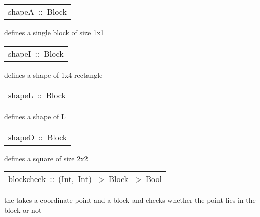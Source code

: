 \begin{haddockdesc}
\item[\begin{tabular}{@{}l}
shapeA\ ::\ Block
\end{tabular}]\haddockbegindoc
{} defines a single block of size 1x1\par

\end{haddockdesc}
\begin{haddockdesc}
\item[\begin{tabular}{@{}l}
shapeI\ ::\ Block
\end{tabular}]\haddockbegindoc
{} defines a shape of 1x4 rectangle\par

\end{haddockdesc}
\begin{haddockdesc}
\item[\begin{tabular}{@{}l}
shapeL\ ::\ Block
\end{tabular}]\haddockbegindoc
{} defines a shape of L\par

\end{haddockdesc}
\begin{haddockdesc}
\item[\begin{tabular}{@{}l}
shapeO\ ::\ Block
\end{tabular}]\haddockbegindoc
{} defines a square of size 2x2\par

\end{haddockdesc}
\begin{haddockdesc}
\item[\begin{tabular}{@{}l}
blockcheck\ ::\ (Int,\ Int)\ ->\ Block\ ->\ Bool
\end{tabular}]\haddockbegindoc
the  takes a coordinate point and a block and checks whether the point lies in the block or not \par

\end{haddockdesc}